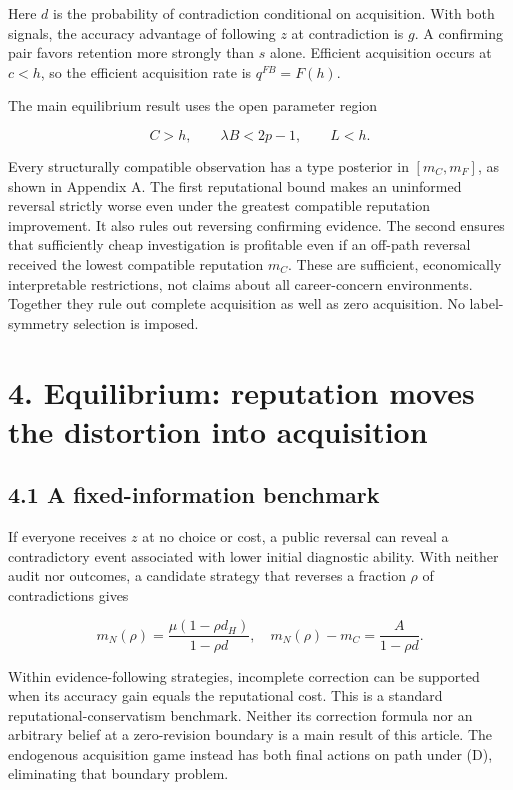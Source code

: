 \documentclass[
  11pt,
]{article}
\begin{document}
Here \(d\) is the probability of contradiction conditional on
acquisition. With both signals, the accuracy advantage of following
\(z\) at contradiction is \(g\). A confirming pair favors retention more
strongly than \(s\) alone. Efficient acquisition occurs at \(c<h\), so
the efficient acquisition rate is \(q^{FB}=F(h)\).

The main equilibrium result uses the open parameter region

\[C>h,\qquad \lambda B<2p-1,\qquad L<h.\tag{D}\]

Every structurally compatible observation has a type posterior in
\([m_C,m_F]\), as shown in Appendix A. The first reputational bound
makes an uninformed reversal strictly worse even under the greatest
compatible reputation improvement. It also rules out reversing
confirming evidence. The second ensures that sufficiently cheap
investigation is profitable even if an off-path reversal received the
lowest compatible reputation \(m_C\). These are sufficient, economically
interpretable restrictions, not claims about all career-concern
environments. Together they rule out complete acquisition as well as
zero acquisition. No label-symmetry selection is imposed.

\section{4. Equilibrium: reputation moves the distortion into
acquisition}\label{equilibrium-reputation-moves-the-distortion-into-acquisition}

\subsection{4.1 A fixed-information
benchmark}\label{a-fixed-information-benchmark}

If everyone receives \(z\) at no choice or cost, a public reversal can
reveal a contradictory event associated with lower initial diagnostic
ability. With neither audit nor outcomes, a candidate strategy that
reverses a fraction \(\rho\) of contradictions gives

\[m_N(\rho)=\frac{\mu(1-\rho d_H)}{1-\rho d},\quad
m_N(\rho)-m_C=\frac{A}{1-\rho d}.\tag{3}\]

Within evidence-following strategies, incomplete correction can be
supported when its accuracy gain equals the reputational cost. This is a
standard reputational-conservatism benchmark. Neither its correction
formula nor an arbitrary belief at a zero-revision boundary is a main
result of this article. The endogenous acquisition game instead has both
final actions on path under (D), eliminating that boundary problem.
\end{document}

